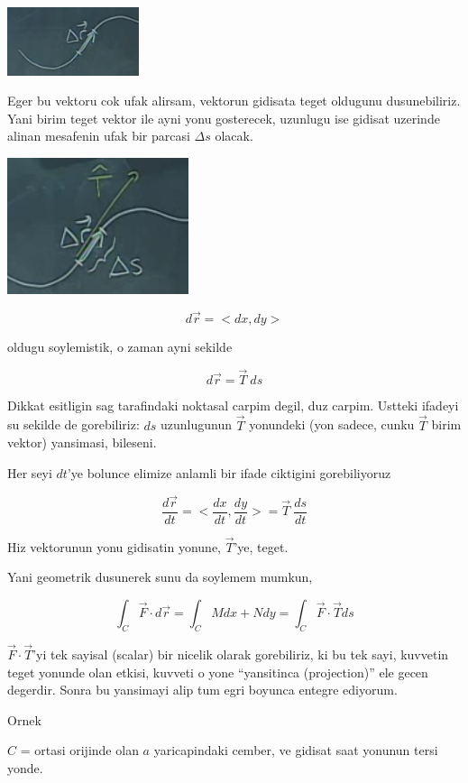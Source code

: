 \documentclass[12pt,fleqn]{article}\usepackage{../common}
\begin{document}
\includegraphics[height=2cm]{19_11.png}

Eger bu vektoru cok ufak alirsam, vektorun gidisata teget oldugunu
dusunebiliriz. Yani birim teget vektor ile ayni yonu gosterecek, uzunlugu
ise gidisat uzerinde alinan mesafenin ufak bir parcasi $\Delta s$ olacak. 

\includegraphics[height=4cm]{19_12.png}

\[ d\vec{r} = <dx, dy> \]
 
oldugu soylemistik, o zaman ayni sekilde

\[  d\vec{r} = \vec{T} \ ds \]

Dikkat esitligin sag tarafindaki noktasal carpim degil, duz carpim. Ustteki
ifadeyi su sekilde de gorebiliriz: $ds$ uzunlugunun $\vec{T}$ yonundeki
(yon sadece, cunku $\vec{T}$ birim vektor) yansimasi, bileseni.

Her seyi $dt$'ye bolunce elimize anlamli bir ifade ciktigini gorebiliyoruz

\[ \frac{d\vec{r}}{dt} = <\frac{dx}{dt}, \frac{dy}{dt}> 
= \vec{T} \ \frac{ds}{dt} 
\]

Hiz vektorunun yonu gidisatin yonune, $\vec{T}$'ye, teget.

Yani geometrik dusunerek sunu da soylemem mumkun,

\[  \int_C \vec{F} \cdot d\vec{r}  = \int_C M dx + N dy
=  \int_C \vec{F} \cdot \vec{T} ds
\]

$\vec{F} \cdot \vec{T}$'yi tek sayisal (scalar) bir nicelik olarak gorebiliriz, ki bu tek 
sayi, kuvvetin teget yonunde olan etkisi, kuvveti o yone 
``yansitinca (projection)'' ele gecen degerdir. Sonra bu yansimayi alip
tum egri boyunca entegre ediyorum. 

Ornek

$C$ = ortasi orijinde olan $a$ yaricapindaki cember, ve gidisat saat
yonunun tersi yonde.
\end{document}
